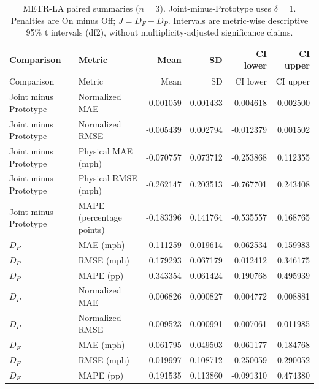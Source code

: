 \documentclass[a4paper,10pt]{article}
\begin{document}
\begingroup\footnotesize\setlength{\tabcolsep}{4pt}
\begin{longtable}{llrrrr}
\caption{METR-LA paired summaries ($n=3$). Joint-minus-Prototype uses $\delta=1$. Penalties are On minus Off; $J=D_F-D_P$. Intervals are metric-wise descriptive 95\% t intervals (df2), without multiplicity-adjusted significance claims.}\\
\toprule
Comparison & Metric & Mean & SD & CI lower & CI upper \\
\midrule\endfirsthead
\toprule
Comparison & Metric & Mean & SD & CI lower & CI upper \\
\midrule\endhead

Joint minus Prototype & Normalized MAE & -0.001059 & 0.001433 & -0.004618 & 0.002500 \\

Joint minus Prototype & Normalized RMSE & -0.005439 & 0.002794 & -0.012379 & 0.001502 \\

Joint minus Prototype & Physical MAE (mph) & -0.070757 & 0.073712 & -0.253868 & 0.112355 \\

Joint minus Prototype & Physical RMSE (mph) & -0.262147 & 0.203513 & -0.767701 & 0.243408 \\

Joint minus Prototype & MAPE (percentage points) & -0.183396 & 0.141764 & -0.535557 & 0.168765 \\

$D_P$ & MAE (mph) & 0.111259 & 0.019614 & 0.062534 & 0.159983 \\

$D_P$ & RMSE (mph) & 0.179293 & 0.067179 & 0.012412 & 0.346175 \\

$D_P$ & MAPE (pp) & 0.343354 & 0.061424 & 0.190768 & 0.495939 \\

$D_P$ & Normalized MAE & 0.006826 & 0.000827 & 0.004772 & 0.008881 \\

$D_P$ & Normalized RMSE & 0.009523 & 0.000991 & 0.007061 & 0.011985 \\

$D_F$ & MAE (mph) & 0.061795 & 0.049503 & -0.061177 & 0.184768 \\

$D_F$ & RMSE (mph) & 0.019997 & 0.108712 & -0.250059 & 0.290052 \\

$D_F$ & MAPE (pp) & 0.191535 & 0.113860 & -0.091310 & 0.474380 \\


\end{longtable}
\end{document}
